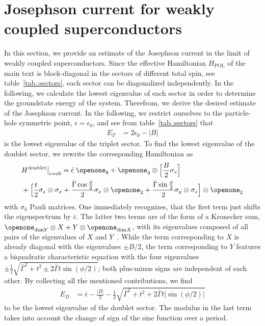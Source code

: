 \documentclass[aps,prb,twocolumn,superscriptaddress,amsmath,amssymb,longbibliography]{revtex4-1}
\newcommand{\abs}[1]{\ensuremath{|#1|}}
\newcommand{\id}{{\ensuremath{\openone}}}
\begin{document}
	\section{Josephson current for weakly coupled superconductors} 
	In this section, we provide an estimate of the Josephson current in the limit of weakly coupled superconductors. 
	Since the effective Hamiltonian $H_{\textrm{POL}}$ of the main text is block-diagonal in the sectors of different total spin,   
	see table~\ref{tab.:sectors}, each sector can be diagonalized independently. In the following, we calculate the 
	lowest eigenvalue of each sector in order to determine the groundstate energy of the system. Therefrom, we
	derive the desired estimate of the Josephson current.
	In the following, we restrict ourselves to the particle-hole symmetric point, $\epsilon=\epsilon_0$, and see from table~\ref{tab.:sectors} that
	\begin{align}
	E_T &=2\epsilon_0-\abs{B}\label{eq.:ET}
	\end{align}
	is the lowest eigenvalue of the triplet sector.
	To find the lowest eigenvalue of the doublet sector, we rewrite the corresponding Hamiltonian as
	\begin{align}
	&H^{\textrm{doublet}}\big|_{\epsilon=\epsilon0} = 
	\bar\epsilon\;\id_8 + \id_4\otimes\Big[\frac{B}{2}\sigma_z\Big]\\
	&+\Big[
		\frac{t}{2}\sigma_z\otimes\sigma_x
		+\frac{\bar\Gamma\cos\frac{\phi}{2}}{2}\sigma_x\otimes\id_2
		+ \frac{\bar\Gamma\sin\frac{\phi}{2}}{2}\sigma_y\otimes\sigma_z 
	\Big]\otimes\id_2 \nonumber\label{eq.:HDPH}
	\end{align}
	with $\sigma_k$ Pauli matrices.
	One immediately recognizes, that the first term just shifts the eigenspectrum by $\bar\epsilon$.
	The latter two terms are of the form of a Kronecker sum, 
	$\id_{\textrm{dim} Y}\otimes X + Y\otimes\id_{\textrm{dim} X}$, with its 
	eigenvalues composed of all pairs 
	of the eigenvalues of $X$ and $Y$~\cite{Laub2004a,Bjoerck2015a}.
	While the term corresponding to $X$ is already diagonal with the eigenvalues $\pm B/2$, 
	the term corresponding to $Y$ features a  biquadratic characteristic equation with the four 
	eigenvalues $\pm\frac{1}{2}\sqrt{{\bar\Gamma}^2+t^2\pm 2\bar\Gamma t\sin(\phi/2)}$;
	both plus-minus signs are independent of each other. By collecting all the mentioned
	contributions, we find
	\begin{equation}
		\begin{split}
			E_D 
			&= \bar\epsilon - \frac{\abs{B}}{2} -\frac{1}{2}\sqrt{{\bar\Gamma}^2+t^2 +2\bar\Gamma t\abs{\sin(\phi/2)}}
		\end{split} 
		\label{eq.:ED} 
	\end{equation}
	to be the lowest eigenvalue of the doublet sector. The modulus in the last term takes into account the
	change of sign of the sine function over a period.
	
\end{document}
